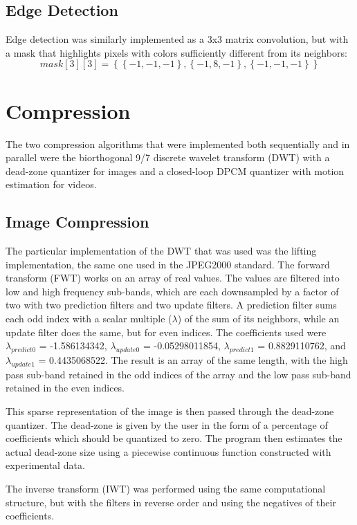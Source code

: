 \documentclass[10pt,twocolumn,twoside]{IEEEtran}
\begin{document}
\subsection{Edge Detection}
Edge detection was similarly implemented as a 3x3 matrix convolution, but with a mask that highlights pixels 
with colors sufficiently different from its neighbors:
\begin{equation*}
mask[3][3] = \left\{ \left\{-1, -1, -1\right\}, \left\{-1, 8, -1\right\}, \left\{-1, -1, -1\right\} \right\}
\end{equation*}

\section{Compression}
The two compression algorithms that were implemented both sequentially and in parallel were the biorthogonal 
9/7 discrete wavelet transform (DWT) with a dead-zone quantizer for images and a closed-loop DPCM quantizer 
with motion estimation for videos.

\subsection{Image Compression}	
The particular implementation of the DWT that was used was the lifting implementation, the same one used in 
the JPEG2000 standard.\cite{jpeg2000} The forward transform (FWT) works on an array of real values. The values 
are filtered into low and high frequency sub-bands, which are each downsampled by a factor of two with two 
prediction filters and two update filters. A prediction filter sums each odd index with a scalar multiple ($
\lambda$) of the sum of its neighbors, while an update filter does the same, but for even indices. The 
coefficients used were $\lambda_{predict0}$ = -1.586134342, $\lambda_{update0}$ = -0.05298011854, $\lambda_
{predict1}$ = 0.8829110762, and $\lambda_{update1}$ = 0.4435068522. The result is an array of the same length, 
with the high pass sub-band retained in the odd indices of the array and the low pass sub-band retained in the 
even indices. 

This sparse representation of the image is then passed through the dead-zone quantizer. The dead-zone is given 
by the user in the form of a percentage of coefficients which should be quantized to zero. The program then 
estimates the actual dead-zone size using a piecewise continuous function constructed with experimental data.

The inverse transform (IWT) was performed using the same computational structure, but with the filters in 
reverse order and using the negatives of their coefficients.
\end{document}
